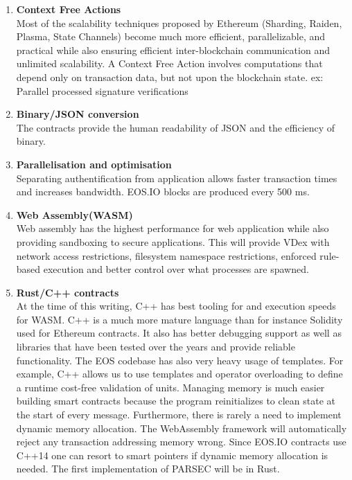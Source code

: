 \documentclass[]{article}
\begin{document}
	\begin{enumerate}
					
			\item \textbf{Context Free Actions} \\
		Most of the scalability techniques proposed by Ethereum (Sharding, Raiden, Plasma, State Channels) 
		become much more efficient, parallelizable, and practical while also ensuring efficient inter-blockchain communication and unlimited scalability.
		A Context Free Action involves computations that depend only on transaction data, but not upon the blockchain state.
		ex: Parallel processed signature verifications\\
		
		\item\textbf{ Binary/JSON conversion} \\
		 The contracts provide the human readability of JSON and the efficiency of binary. \\
	
		\item \textbf{Parallelisation and optimisation\\ } 
		Separating authentification from application allows faster transaction times and increases bandwidth.
		EOS.IO blocks are produced every 500 ms.
		
	\item \textbf{Web Assembly(WASM)}   \\
	Web assembly has the highest performance for web application while also providing sandboxing to secure applications.
	This will provide VDex with network access restrictions,
	filesystem namespace restrictions, enforced rule-based execution and better control over what processes are spawned.
	
	\item \textbf{Rust/C++ contracts\\}
	At the time of this writing,
	C++ has best tooling for and execution speeds for WASM.
	C++ is a much more mature language than for instance Solidity used for Ethereum contracts.
	It also has better debugging support as well as libraries that have been tested over the years and provide reliable functionality. 
	The EOS codebase has also very heavy usage of templates.
	For example, C++ allows us to use templates and operator overloading to define a runtime cost-free validation of units.
	Managing memory is much easier building smart contracts because the
	program reinitializes to clean state at the start of every message. Furthermore, there is rarely a need to implement dynamic memory allocation. 
	The WebAssembly framework will automatically reject any transaction addressing memory wrong.
	Since EOS.IO contracts use C++14 one can resort to smart pointers if dynamic memory allocation is needed.
	The first implementation of PARSEC will be in Rust.\cite{23}
	 	

\end{enumerate}
\end{document}
